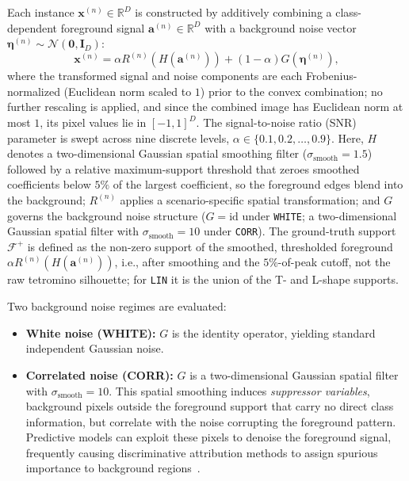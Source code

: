 \documentclass[pdflatex,sn-mathphys-num]{sn-jnl}
\theoremstyle{thmstyleone}
\theoremstyle{thmstyletwo}%
\theoremstyle{thmstylethree}%
\begin{document}
Each instance $\mathbf{x}^{(n)} \in \mathbb{R}^{D}$ is constructed by additively combining a class-dependent foreground signal $\mathbf{a}^{(n)} \in \mathbb{R}^{D}$ with a background noise vector $\boldsymbol{\eta}^{(n)} \sim \mathcal{N}(\mathbf{0}, \mathbf{I}_{D})$:
\begin{equation}
    \mathbf{x}^{(n)} = \alpha R^{(n)}\!\left(H\!\left(\mathbf{a}^{(n)}\right)\right) + (1-\alpha)G\!\left(\boldsymbol{\eta}^{(n)}\right),
    \label{eq:xaitris_generation}
\end{equation}
where the transformed signal and noise components are each Frobenius-normalized (Euclidean norm scaled to $1$) prior to the convex combination; no further rescaling is applied, and since the combined image has Euclidean norm at most $1$, its pixel values lie in $[-1, 1]^{D}$. The signal-to-noise ratio (SNR) parameter is swept across nine discrete levels, $\alpha \in \{0.1, 0.2, \dots, 0.9\}$. Here, $H$ denotes a two-dimensional Gaussian spatial smoothing filter ($\sigma_{\text{smooth}} = 1.5$) followed by a relative maximum-support threshold that zeroes smoothed coefficients below $5\%$ of the largest coefficient, so the foreground edges blend into the background; $R^{(n)}$ applies a scenario-specific spatial transformation; and $G$ governs the background noise structure ($G = \mathrm{id}$ under \texttt{WHITE}; a two-dimensional Gaussian spatial filter with $\sigma_{\text{smooth}} = 10$ under \texttt{CORR}). The ground-truth support $\mathcal{F}^+$ is defined as the non-zero support of the smoothed, thresholded foreground $\alpha R^{(n)}(H(\mathbf{a}^{(n)}))$, i.e., after smoothing and the $5\%$-of-peak cutoff, not the raw tetromino silhouette; for \texttt{LIN} it is the union of the T- and L-shape supports.

Two background noise regimes are evaluated:
\begin{itemize}
    \item \textbf{White noise (WHITE):} $G$ is the identity operator, yielding standard independent Gaussian noise.
    \item \textbf{Correlated noise (CORR):} $G$ is a two-dimensional Gaussian spatial filter with $\sigma_{\text{smooth}} = 10$. This spatial smoothing induces \emph{suppressor variables}, background pixels outside the foreground support that carry no direct class information, but correlate with the noise corrupting the foreground pattern. Predictive models can exploit these pixels to denoise the foreground signal, frequently causing discriminative attribution methods to assign spurious importance to background regions~\cite{haufe2014, wilming2022}.
\end{itemize}
\end{document}
